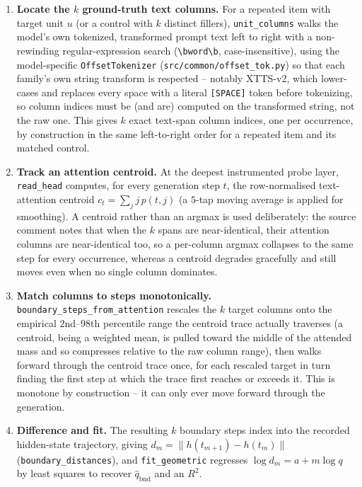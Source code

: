 \documentclass[11pt]{article}
\begin{document}
\begin{enumerate}
\item \textbf{Locate the $k$ ground-truth text columns.} For a repeated item
  with target unit $u$ (or a control with $k$ distinct fillers),
  \texttt{unit\_columns} walks the model's own tokenized, transformed prompt
  text left to right with a non-rewinding regular-expression search
  (\texttt{\textbackslash b}\texttt{word}\texttt{\textbackslash b}, case-insensitive), using the
  model-specific \texttt{OffsetTokenizer} (\texttt{src/common/offset\_tok.py})
  so that each family's own string transform is respected -- notably XTTS-v2,
  which lower-cases and replaces every space with a literal
  \texttt{[SPACE]} token before tokenizing, so column indices must be (and
  are) computed on the transformed string, not the raw one. This gives $k$
  exact text-span column indices, one per occurrence, by construction in the
  same left-to-right order for a repeated item and its matched control.
\item \textbf{Track an attention centroid.} At the deepest instrumented probe
  layer, \texttt{read\_head} computes, for every generation step $t$, the
  row-normalised text-attention centroid $c_t = \sum_j j\, p(t,j)$ (a
  $5$-tap moving average is applied for smoothing). A centroid rather than an
  arg\-max is used deliberately: the source comment notes that when the $k$
  spans are near-identical, their attention columns are near-identical too,
  so a per-column argmax collapses to the same step for every occurrence,
  whereas a centroid degrades gracefully and still moves even when no single
  column dominates.
\item \textbf{Match columns to steps monotonically.}
  \texttt{boundary\_steps\_from\_attention} rescales the $k$ target columns
  onto the empirical $2$nd--$98$th percentile range the centroid trace
  actually traverses (a centroid, being a weighted mean, is pulled toward the
  middle of the attended mass and so compresses relative to the raw column
  range), then walks forward through the centroid trace once, for each
  rescaled target in turn finding the first step at which the trace first
  reaches or exceeds it. This is monotone by construction -- it can only ever
  move forward through the generation.
\item \textbf{Difference and fit.} The resulting $k$ boundary steps index
  into the recorded hidden-state trajectory, giving
  $d_m = \lVert h(t_{m+1}) - h(t_m)\rVert$
  (\texttt{boundary\_distances}), and \texttt{fit\_geometric} regresses
  $\log d_m = a + m\log q$ by least squares to recover $\hat q_{\text{bnd}}$
  and an $R^2$.
\end{enumerate}
\end{document}
